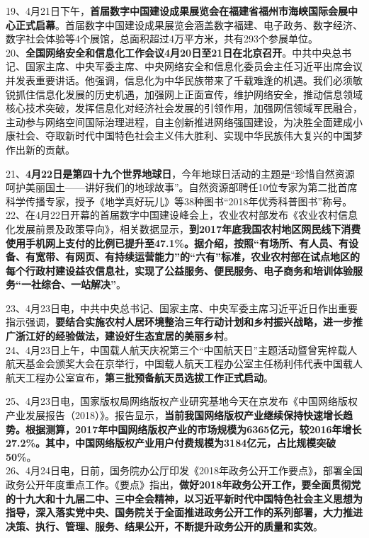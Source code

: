 19、4月21日下午，{\textbf{首届数字中国建设成果展览会在福建省福州市海峡国际会展中心正式启幕}}。首届数字中国建设成果展览会涵盖数字福建、电子政务、数字经济、数字社会体验等4个展馆，总面积超过4万平方米，共有293个参展单位。\\
20、{\textbf{全国网络安全和信息化工作会议4月20日至21日在北京召开}}。中共中央总书记、国家主席、中央军委主席、中央网络安全和信息化委员会主任习近平出席会议并发表重要讲话。他强调，信息化为中华民族带来了千载难逢的机遇。我们必须敏锐抓住信息化发展的历史机遇，加强网上正面宣传，维护网络安全，推动信息领域核心技术突破，发挥信息化对经济社会发展的引领作用，加强网信领域军民融合，主动参与网络空间国际治理进程，自主创新推进网络强国建设，为决胜全面建成小康社会、夺取新时代中国特色社会主义伟大胜利、实现中华民族伟大复兴的中国梦作出新的贡献。

21、{\textbf{4月22日是第四十九个世界地球日}}，今年地球日活动的主题是``珍惜自然资源
呵护美丽国土------讲好我们的地球故事''。自然资源部聘任10位专家为第二批首席科学传播专家，授予《地学真好玩儿》等38种图书``2018年优秀科普图书''称号。\\
22、在4月22日开幕的首届数字中国建设峰会上，农业农村部发布《农业农村信息化发展前景及政策导向》，相关数据显示，{\textbf{到2017年底我国农村地区网民线下消费使用手机网上支付的比例已提升至47.1\%。据介绍，按照``有场所、有人员、有设备、有宽带、有网页、有持续运营能力''的``六有''标准，农业农村部在试点地区的每个行政村建设益农信息社，实现了公益服务、便民服务、电子商务和培训体验服务``一社综合、一站解决''}}。

23、4月23日电，中共中央总书记、国家主席、中央军委主席习近平近日作出重要指示强调，{\textbf{要结合实施农村人居环境整治三年行动计划和乡村振兴战略，进一步推广浙江好的经验做法，建设好生态宜居的美丽乡村}}。\\
24、4月23日上午，中国载人航天庆祝第三个``中国航天日''主题活动暨曾宪梓载人航天基金会颁奖大会在京举行，中国载人航天工程办公室主任杨利伟代表中国载人航天工程办公室宣布，{\textbf{第三批预备航天员选拔工作正式启动}}。

25、4月23日电，国家版权局网络版权产业研究基地今天在京发布《中国网络版权产业发展报告（2018）》。报告显示，{\textbf{当前我国网络版权产业继续保持快速增长趋势。根据测算，2017年中国网络版权产业的市场规模为6365亿元，较2016年增长27.2\%。其中，中国网络版权产业用户付费规模为3184亿元，占比规模突破50\%}}。\\
26、4月24日电，日前，国务院办公厅印发《2018年政务公开工作要点》，部署全国政务公开年度重点工作。《要点》指出，{\textbf{做好2018年政务公开工作，要全面贯彻党的十九大和十九届二中、三中全会精神，以习近平新时代中国特色社会主义思想为指导，深入落实党中央、国务院关于全面推进政务公开工作的系列部署，大力推进决策、执行、管理、服务、结果公开，不断提升政务公开的质量和实效}}。

